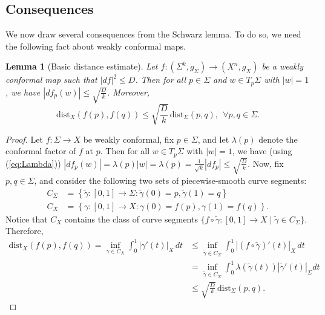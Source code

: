 \documentclass[11pt]{article}
\newtheorem{lem}[thm]{Lemma}
\theoremstyle{definition}
\numberwithin{equation}{section}
\begin{document}
\subsection{Consequences} \label{sub:Consequences}

\indent \indent We now draw several consequences from the Schwarz lemma.  To do so, we need the following fact about weakly conformal maps.

\begin{lem}[Basic distance estimate] \label{lem:BasicDistance} Let $f \colon (\Sigma^k, g_\Sigma) \to (X^n, g_X)$ be a weakly conformal map such that $|df|^2 \leq D$.  Then for all $p \in \Sigma$ and $w \in T_p\Sigma$ with $|w| = 1$, we have $\left| df_p(w) \right| \leq \sqrt{ \frac{D}{k} }$.  Moreover,
$$\mathrm{dist}_X(f(p), f(q)) \leq \sqrt{ \frac{D}{k} }\,\mathrm{dist}_\Sigma(p,q), \ \ \forall p,q \in \Sigma.$$
\end{lem}

\begin{proof} Let $f \colon \Sigma \to X$ be weakly conformal, fix $p \in \Sigma$, and let $\lambda(p)$ denote the conformal factor of $f$ at $p$.  Then for all $w \in T_p\Sigma$ with $|w| = 1$, we have (using (\ref{eq:Lambda})) $|df_p(w)| = \lambda(p) |w| = \lambda(p) = \frac{1}{\sqrt{k}}|df_p| \leq \sqrt{\frac{D}{k}}$.  Now, fix $p,q \in \Sigma$, and consider the following two sets of piecewise-smooth curve segments:
\begin{align*}
C_\Sigma & = \left\{ \widetilde{\gamma} \colon [0,1] \to \Sigma \colon \widetilde{\gamma}(0) = p, \widetilde{\gamma}(1) = q \right\} \\
C_X & = \left\{ \gamma \colon [0,1] \to X \colon \gamma(0) = f(p), \gamma(1) = f(q) \right\}\!.
\end{align*}
Notice that $C_X$ contains the class of curve segments $\{f \circ \widetilde{\gamma} \colon [0,1] \to X \mid \widetilde{\gamma} \in C_\Sigma\}$.  Therefore,
\begin{align*}
\mathrm{dist}_X(f(p), f(q)) = \inf_{\gamma \in C_X} \int_0^1 | \gamma'(t) |_X\,dt & \leq \inf_{\widetilde{\gamma} \in C_\Sigma} \int_0^1 \left| (f \circ \widetilde{\gamma})'(t) \right|_X\,dt \\
& = \inf_{\widetilde{\gamma} \in C_\Sigma} \int_0^1 \lambda(\widetilde{\gamma}(t)) \left| \widetilde{\gamma}'(t) \right|_\Sigma dt \\
& \leq \sqrt{\frac{D}{k}} \,\mathrm{dist}_\Sigma(p,q).
\end{align*}
\end{proof}
\end{document}
